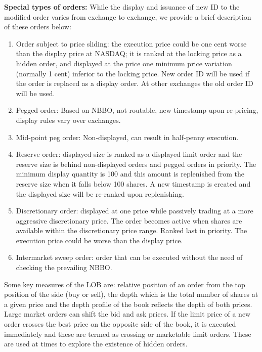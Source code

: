\noindent\textbf{Special types of orders:} While the display and issuance of new ID to the modified order varies from exchange to exchange, we provide a brief description of these orders below:

\begin{enumerate}[1.]
\item Order subject to price sliding: the execution price could be one cent worse than the display price at NASDAQ; it is ranked at the locking price as a hidden order, and displayed at the price one minimum price variation (normally 1 cent) inferior to the locking price. New order ID will be used if the order is replaced as a display order. At other exchanges the old order ID will be used.

\item Pegged order: Based on NBBO, not routable, new timestamp upon re-pricing, display rules vary over exchanges.

\item Mid-point peg order: Non-displayed, can result in half-penny execution.

\item Reserve order: displayed size is ranked as a displayed limit order and the reserve size is behind non-displayed orders and pegged orders in priority. The minimum display quantity is 100 and this amount is replenished from the reserve size when it falls below 100 shares. A new timestamp is created and the displayed size will be re-ranked upon replenishing.

\item Discretionary order: displayed at one price while passively trading at a more aggressive discretionary price. The order becomes active when shares are available within the discretionary price range. Ranked last in priority. The execution price could be worse than the display price.

\item Intermarket sweep order: order that can be executed without the need of checking the prevailing NBBO.  
\end{enumerate}


Some key measures of the LOB are: relative position of an order from the top position of the side (buy or sell), the depth which is the total number of shares at a given price and the depth profile of the book reflects the depth of both prices. Large market orders can shift the bid and ask prices. If the limit price of a new order crosses the best price on the opposite side of the book, it is executed immediately and these are termed as crossing or marketable limit orders. These are used at times to explore the existence of hidden orders.


